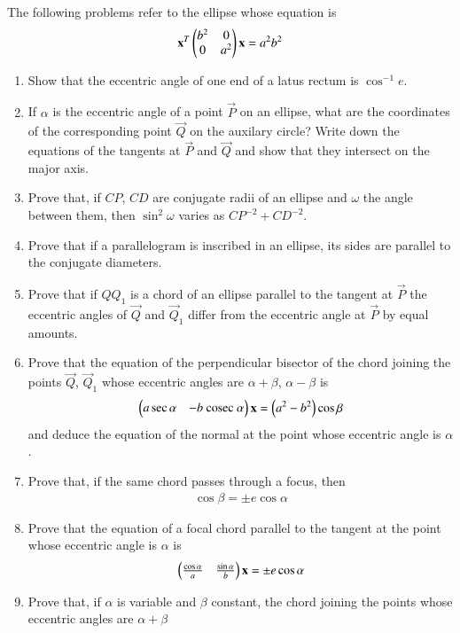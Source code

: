 \renewcommand{\theequation}{\theenumi}
The following problems refer to the ellipse whose 
equation is
\begin{align*}
\mathbf{x}^T\begin{pmatrix}b^2 & 0\\0 & a^2\end{pmatrix}\mathbf{x} =a^2b^2
\end{align*}
\begin{enumerate}[label=\arabic*.,ref=\thesubsection.\theenumi]
\item Show that the eccentric angle of one end of a latus rectum is $\cos^{-1}e$.
\item If $\alpha$ is the eccentric angle of a point $\vec{P}$ on an ellipse, what are the coordinates of the
corresponding point $\vec{Q}$ on the auxilary circle?
Write down the equations of the tangents at $\vec{P}$ and $\vec{Q}$ and show that they intersect on the major axis.
\item Prove that, if $CP$, $CD$ are conjugate radii of an ellipse and $\omega$ the angle between them, then
$\sin^{2}\omega$ varies as $CP^{-2}+CD^{-2}$.
\item Prove that if a parallelogram is inscribed in an ellipse, its sides are parallel to 
the conjugate diameters.
\item Prove that if $QQ_1$ is a chord of an ellipse parallel to the tangent at $\vec{P}$ the eccentric angles
of $\vec{Q}$ and $\vec{Q}_1$ differ from the eccentric angle at $\vec{P}$ by equal amounts.
\item Prove that the equation of the perpendicular bisector of the chord joining the points $\vec{Q}$, $\vec{Q}_1$ whose
eccentric angles are $\alpha+\beta$, $\alpha-\beta$ is 
\begin{align}
\begin{pmatrix}a\sec \alpha & -b\text{ cosec } \alpha\end{pmatrix}\mathbf{x} = \left(a^2-b^2\right)\cos\beta
\end{align}
and deduce the equation of the normal at the point whose eccentric angle is $\alpha$.
\item Prove that, if the same chord passes through a focus, then
\begin{align}
\cos\beta = \pm e \cos\alpha
\end{align}
\item Prove that the equation of a focal chord parallel to the tangent at the point whose
eccentric angle is $\alpha$ is
\begin{align}
\begin{pmatrix}\frac{\cos\alpha}{a}  & \frac{\sin\alpha}{b}\end{pmatrix}\mathbf{x} = \pm e \cos\alpha
\end{align}
\item Prove that, if $\alpha$ is variable and $\beta$ constant, the chord joining the points whose eccentric angles are $\alpha+\beta$

\end{enumerate}
